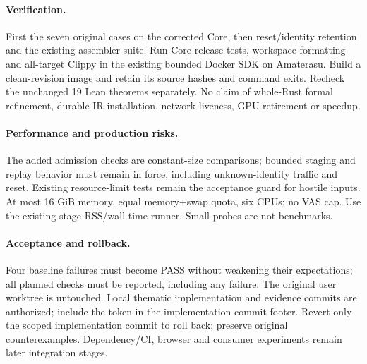 \documentclass[11pt,a4paper]{article}
\begin{document}
\paragraph{Verification.}
First the seven original cases on the corrected Core, then reset/identity
retention and the existing assembler suite. Run Core release tests, workspace
formatting and all-target Clippy in the existing bounded Docker SDK on Amaterasu.
Build a clean-revision image and retain its source hashes and command exits.
Recheck the unchanged 19 Lean theorems separately. No claim of whole-Rust formal
refinement, durable IR installation, network liveness, GPU retirement or speedup.
\paragraph{Performance and production risks.}
The added admission checks are constant-size comparisons; bounded staging and
replay behavior must remain in force, including unknown-identity traffic and
reset. Existing resource-limit tests remain the acceptance guard for hostile
inputs. At most 16 GiB memory, equal memory+swap quota, six CPUs; no VAS cap.
Use the existing stage RSS/wall-time runner. Small probes are not benchmarks.
\paragraph{Acceptance and rollback.}
Four baseline failures must become PASS without weakening their expectations;
all planned checks must be reported, including any failure. The original user
worktree is untouched. Local thematic implementation and evidence commits are
authorized; include the token in the implementation commit footer. Revert only
the scoped implementation commit to roll back; preserve original counterexamples.
Dependency/CI, browser and consumer experiments remain later integration stages.

\end{document}
